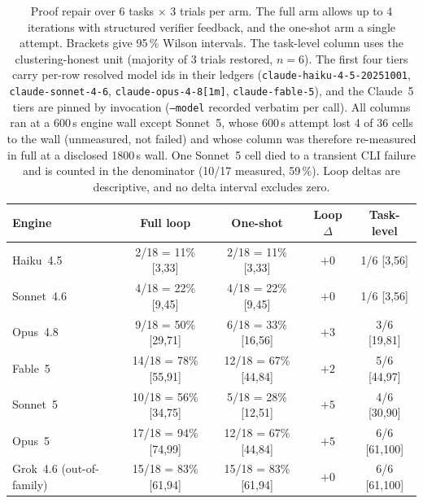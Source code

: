 \documentclass{article}
\newcommand{\ehaiku}{Haiku~4.5}
\newcommand{\esonnet}{Sonnet~4.6}
\newcommand{\eopus}{Opus~4.8}
\newcommand{\efable}{Fable~5}
\newcommand{\egrok}{Grok~4.6}
\begin{document}
\begin{table}[t]
\centering
\caption{Proof repair over 6 tasks $\times$ 3 trials per arm. The full arm
allows up to 4 iterations with structured verifier feedback, and the
one-shot arm a single attempt. Brackets give 95\,\% Wilson intervals.
The task-level column uses the clustering-honest unit (majority of 3
trials restored, $n{=}6$). The first four tiers carry per-row resolved
model ids in their ledgers (\texttt{claude-haiku-4-5-20251001},
\texttt{claude-sonnet-4-6}, \texttt{claude-opus-4-8[1m]},
\texttt{claude-fable-5}), and the Claude~5 tiers are pinned by invocation
(\texttt{--model} recorded verbatim per call). All columns ran at a
600\,s engine wall except Sonnet~5, whose 600\,s attempt lost 4 of 36
cells to the wall (unmeasured, not failed) and whose column was therefore
re-measured in full at a disclosed 1800\,s wall. One Sonnet~5 cell died
to a transient CLI failure and is counted in the denominator (10/17
measured, 59\,\%). Loop deltas are descriptive, and no delta interval
excludes zero.}
\label{tab:repair}
\small
\setlength{\tabcolsep}{4pt}
\begin{tabular}{lcccc}
\toprule
Engine & Full loop & One-shot & Loop $\Delta$ & Task-level \\
\midrule
\ehaiku & 2/18 = 11\% [3,33] & 2/18 = 11\% [3,33] & $+0$ & 1/6 [3,56] \\
\esonnet & 4/18 = 22\% [9,45] & 4/18 = 22\% [9,45] & $+0$ & 1/6 [3,56] \\
\eopus & 9/18 = 50\% [29,71] & 6/18 = 33\% [16,56] & $+3$ & 3/6 [19,81] \\
\efable & 14/18 = 78\% [55,91] & 12/18 = 67\% [44,84] & $+2$ & 5/6 [44,97] \\
Sonnet~5 & 10/18 = 56\% [34,75] & 5/18 = 28\% [12,51] & $+5$ & 4/6 [30,90] \\
Opus~5 & 17/18 = 94\% [74,99] & 12/18 = 67\% [44,84] & $+5$ & 6/6 [61,100] \\
\midrule
\egrok{} (out-of-family) & 15/18 = 83\% [61,94] & 15/18 = 83\% [61,94] & $+0$ & 6/6 [61,100] \\
\bottomrule
\end{tabular}
\end{table}
\end{document}
